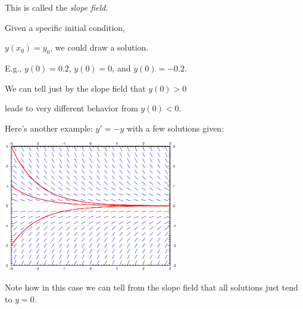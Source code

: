 \documentclass[10pt,aspectratio=169]{beamer}
\begin{document}
\begin{frame}
\vspace*{-1.3in}
\pause

This is called the \emph{slope field}.

\pause
\medskip

Given a specific initial condition,

$y(x_0)=y_0$, we could draw a solution.

\pause
\medskip

E.g., $y(0) = 0.2$, $y(0) = 0$, and $y(0) = -0.2$.

\vspace*{-109.5pt}
\hspace*{3in}

\pause
\vspace*{-0.33in}

We can tell just by the slope field that $y(0) > 0$

leads to very different behavior from $y(0) < 0$.

\end{frame}

\begin{frame}

Here's another example: $y'=-y$ with a few solutions given:

\begin{center}
\includegraphics[width=3in]{../figures/1-3-mysl-sol}
\end{center}

\pause

Note how in this case we can tell from the slope field
that all solutions just tend to $y=0$.
\end{frame}
\end{document}
